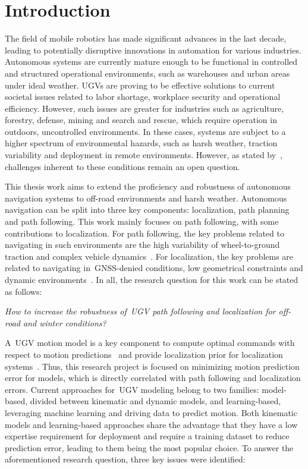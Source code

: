 \documentclass[12pt,letterpaper,oneside]{article}
\begin{document}
\makeCustomTitle
\thispagestyle{titlePage}


\section{Introduction}
\label{sec:introduction}

The field of mobile robotics has made significant advances in the last decade, leading to potentially disruptive innovations in automation for various industries.
Autonomous systems are currently mature enough to be functional in controlled and structured operational environments, such as warehouses and urban areas under ideal weather.
\Acp{UGV} are proving to be effective solutions to current societal issues related to labor shortage, workplace security and operational efficiency. 
However, such issues are greater for industries such as agriculture, forestry, defense, mining and search and rescue,  which require operation in outdoors, uncontrolled environments.
In these cases, systems are subject to a higher spectrum of environmental hazards, such as harsh weather, traction variability and deployment in remote environments.
However, as stated by~\citet{VanBrummelen2018}, challenges inherent to these conditions remain an open question.

This thesis work aims to extend the proficiency and robustness of autonomous navigation systems to off-road environments and harsh weather. 
Autonomous navigation can be split into three key components: localization, path planning and path following. 
This work mainly focuses on path following, with some contributions to localization.
For path following, the key problems related to navigating in such environments are the high variability of wheel-to-ground traction and complex vehicle dynamics~\citep{Baril2020}.
For localization, the key problems are related to navigating in~\ac{GNSS}-denied conditions, low geometrical constraints and dynamic environments~\citep{Baril2022}.
In all, the research question for this work can be stated as follows:

\begin{center}
	\emph{
		How to increase the robustness of~\ac{UGV} path following and localization for off-road and winter conditions?
	}
\end{center}

A~\ac{UGV} motion model is a key component to compute optimal commands with respect to motion predictions~\citep{Brunke2022} and provide localization prior for localization systems~\citep{Dumbgen2023}. 
Thus, this research project is focused on minimizing motion prediction error for models, which is directly correlated with path following and localization errors. 
Current approaches for~\ac{UGV} modeling belong to two families: model-based, divided between kinematic and dynamic models, and learning-based, leveraging machine learning and driving data to predict motion.
Both kinematic models and learning-based approaches share the advantage that they have a low expertise requirement for deployment and require a training dataset to reduce prediction error, leading to them being the most popular choice.
To answer the aforementioned research question, three key issues were identified:
\end{document}
